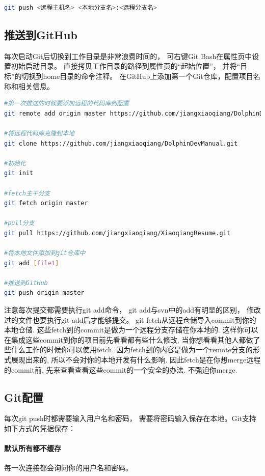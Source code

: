 \documentclass{book}
\begin{document}
\begin{lstlisting}[language=Bash]
git push <远程主机名> <本地分支名>:<远程分支名>
\end{lstlisting}

\subsection{推送到GitHub}

每次启动Git后切换到工作目录是非常浪费时间的，
可右键Git Bash在属性页中设置初始启动目录。
直接拷贝工作目录的路径到属性页的“起始位置”，
并将“目标”的切换到home目录的命令注释。
在GitHub上添加第一个Git仓库，配置项目名称和相关信息。

\begin{lstlisting}[language=Bash]
#第一次推送的时候要添加远程的代码库到配置
git remote add origin master https://github.com/jiangxiaoqiang/DolphinDevManual.git

#将远程代码库克隆到本地
git clone https://github.com/jiangxiaoqiang/DolphinDevManual.git

#初始化
git init

#fetch主干分支
git fetch origin master

#pull分支 
git pull https://github.com/jiangxiaoqiang/XiaoqiangResume.git

#将本地文件添加到git仓库中
git add [file1]

#推送到GitHub
git push origin master
\end{lstlisting}

注意每次提交都需要执行git add命令，
git add与svn中的add有明显的区别，
修改过的文件也要执行git add后才能够提交。
git fetch从远程仓储导入commit到你的本地仓储. 
这些fetch到的commit是做为一个远程分支存储在你本地的. 
这样你可以在集成这些commit到你的项目前先看看都有些什么修改.
当你想看看其他人都做了些什么工作的时候你可以使用fetch. 
因为fetch到的内容是做为一个remote分支的形式展现出来的, 
所以不会对你的本地开发有什么影响. 因此fetch是在你想merge远程的commit前, 
先来查看查看这些commit的一个安全的办法. 不强迫你merge.

\subsection{Git配置}

每次git push时都需要输入用户名和密码，
需要将密码输入保存在本地。Git支持如下方式的凭据保存：

\paragraph{默认所有都不缓存}每一次连接都会询问你的用户名和密码。
\end{document}
